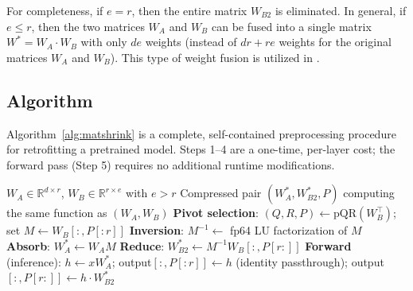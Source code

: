 \documentclass{article}
\newcommand{\eR}[2]{$\in \mathbb{R}^{#1 \times #2}$}  %
\begin{document}
For completeness, if $e = r$, then the entire matrix $W_{B2}$ is eliminated. In general, if $e \leq r$, then the two matrices $W_A$ and $W_B$ can be fused into a single matrix $W^\ast = W_A \cdot W_B$ with only $d e$ weights (instead of $d r + r e$ weights for the original matrices $W_A$ and $W_B$). This type of weight fusion is utilized in \cite{remove, marko}.

\subsection{Algorithm}
Algorithm~\ref{alg:matshrink} is a complete, self-contained preprocessing procedure for retrofitting a pretrained model. Steps 1--4 are a one-time, per-layer cost; the forward pass (Step 5) requires no additional runtime modifications.

\begin{algorithm}[ht]
\caption{MatShrink: preprocessing a back-to-back layer pair}
\label{alg:matshrink}
\begin{algorithmic}[1]
\Require $W_A \in \mathbb{R}^{d \times r}$, $W_B \in \mathbb{R}^{r \times e}$ with $e > r$
\Ensure Compressed pair $(W_A^*, W_{B2}^*, P)$ computing the same function as $(W_A, W_B)$
\State \textbf{Pivot selection}: $(Q, R, P) \gets \mathrm{pQR}(W_B^\top)$; set $M \gets W_B[:, P[:r]]$ 
\State \textbf{Inversion}: $M^{-1} \gets $ fp64 LU factorization of $M$
\State \textbf{Absorb}: $W_A^* \gets W_A M$ 
\State \textbf{Reduce}: $W_{B2}^* \gets M^{-1} W_B[:, P[r:]]$ 
\State \textbf{Forward} (inference): $h \gets x W_A^*$; output$[:, P[:r]] \gets h$ (identity passthrough); output$[:, P[r:]] \gets h \cdot W_{B2}^*$
\end{algorithmic}
\end{algorithm}

\end{document}
